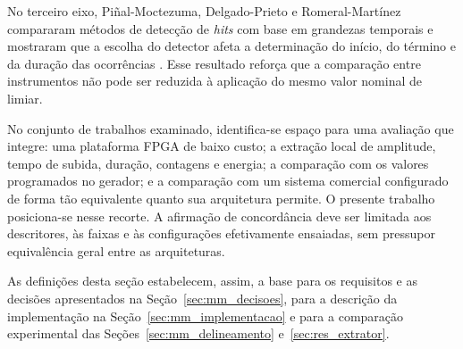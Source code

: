 No terceiro eixo, Piñal-Moctezuma, Delgado-Prieto e Romeral-Martínez compararam métodos de detecção de \textit{hits} com base em grandezas temporais e mostraram que a escolha do detector afeta a determinação do início, do término e da duração das ocorrências \cite{pinal2019}. Esse resultado reforça que a comparação entre instrumentos não pode ser reduzida à aplicação do mesmo valor nominal de limiar.

No conjunto de trabalhos examinado, identifica-se espaço para uma avaliação que integre: uma plataforma FPGA de baixo custo; a extração local de amplitude, tempo de subida, duração, contagens e energia; a comparação com os valores programados no gerador; e a comparação com um sistema comercial configurado de forma tão equivalente quanto sua arquitetura permite. O presente trabalho posiciona-se nesse recorte. A afirmação de concordância deve ser limitada aos descritores, às faixas e às configurações efetivamente ensaiadas, sem pressupor equivalência geral entre as arquiteturas.

As definições desta seção estabelecem, assim, a base para os requisitos e as decisões apresentados na Seção~\ref{sec:mm_decisoes}, para a descrição da implementação na Seção~\ref{sec:mm_implementacao} e para a comparação experimental das Seções~\ref{sec:mm_delineamento} e~\ref{sec:res_extrator}.

